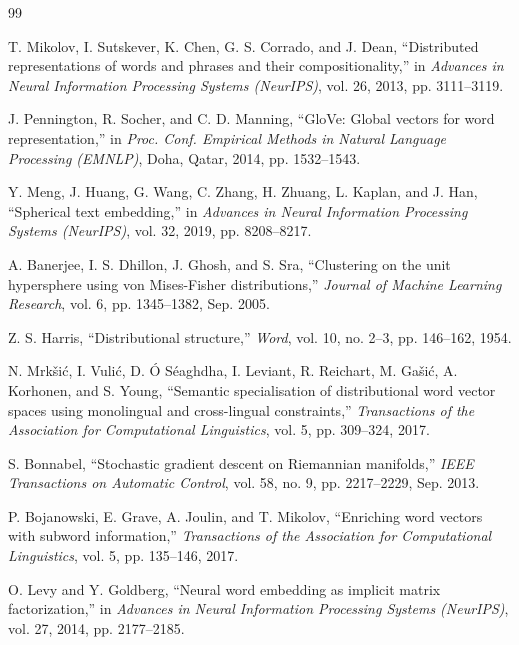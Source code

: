 \documentclass[journal]{IEEEtran}
\begin{document}
\begin{thebibliography}{99}

T. Mikolov, I. Sutskever, K. Chen, G. S. Corrado, and J. Dean, ``Distributed representations of words and phrases and their compositionality,'' in \emph{Advances in Neural Information Processing Systems (NeurIPS)}, vol. 26, 2013, pp. 3111--3119.

J. Pennington, R. Socher, and C. D. Manning, ``GloVe: Global vectors for word representation,'' in \emph{Proc. Conf. Empirical Methods in Natural Language Processing (EMNLP)}, Doha, Qatar, 2014, pp. 1532--1543.

Y. Meng, J. Huang, G. Wang, C. Zhang, H. Zhuang, L. Kaplan, and J. Han, ``Spherical text embedding,'' in \emph{Advances in Neural Information Processing Systems (NeurIPS)}, vol. 32, 2019, pp. 8208--8217.

A. Banerjee, I. S. Dhillon, J. Ghosh, and S. Sra, ``Clustering on the unit hypersphere using von Mises-Fisher distributions,'' \emph{Journal of Machine Learning Research}, vol. 6, pp. 1345--1382, Sep. 2005.

Z. S. Harris, ``Distributional structure,'' \emph{Word}, vol. 10, no. 2--3, pp. 146--162, 1954.

N. Mrk\v{s}i\'{c}, I. Vuli\'{c}, D. \'{O} S\'{e}aghdha, I. Leviant, R. Reichart, M. Ga\v{s}i\'{c}, A. Korhonen, and S. Young, ``Semantic specialisation of distributional word vector spaces using monolingual and cross-lingual constraints,'' \emph{Transactions of the Association for Computational Linguistics}, vol. 5, pp. 309--324, 2017.

S. Bonnabel, ``Stochastic gradient descent on Riemannian manifolds,'' \emph{IEEE Transactions on Automatic Control}, vol. 58, no. 9, pp. 2217--2229, Sep. 2013.

P. Bojanowski, E. Grave, A. Joulin, and T. Mikolov, ``Enriching word vectors with subword information,'' \emph{Transactions of the Association for Computational Linguistics}, vol. 5, pp. 135--146, 2017.

O. Levy and Y. Goldberg, ``Neural word embedding as implicit matrix factorization,'' in \emph{Advances in Neural Information Processing Systems (NeurIPS)}, vol. 27, 2014, pp. 2177--2185.


\end{thebibliography}
\end{document}
